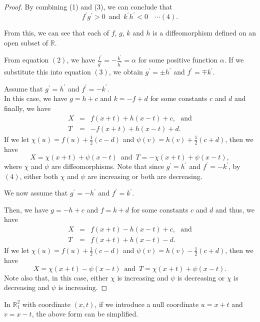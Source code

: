 \documentclass[a4paper,10pt]{amsart}
\theoremstyle{plain}
\newtheorem*{main theorem}{Theorem}
\theoremstyle{definition}
\begin{document}
\begin{proof}
By combining (1) and (3), we can conclude that
$$ f^\prime g^\prime >0 \,\,\, \mbox{and} \,\,\, k^\prime h^\prime
< 0 \,\,\,\,\,\, \cdots(4).$$

From this, we can see that each of $f$, $g$, $k$ and $h$ is a
diffeomorphism defined on an open subset of $\mathbb{R}$.

From equation $(2)$, we have $\frac{f^\prime}{g^\prime} = -
\frac{k^\prime}{h^\prime} = \alpha$ for some positive function
$\alpha$. If we substitute this into equation $(3)$, we obtain
$g^\prime = \pm h^\prime$ and $f^\prime = \mp k^\prime$.


Assume that $g^\prime = h^\prime$ and $f^\prime = -k^\prime$.\\
 In this case, we have $g = h + c$ and $k = -f + d$ for some
 constants $c$ and $d$ and finally, we have
 \begin{eqnarray*}
 X &=& f(x+t) + h(x-t) +c, \,\,\,\, \mbox{and} \\
  T &=& -f(x+t) + h(x-t) + d.
  \end{eqnarray*}
If we let $\chi(u) = f(u) + \frac{1}{2}(c-d)$ and $\psi(v) = h(v)
+ \frac{1}{2}(c+d)$, then we have
$$ X = \chi(x+t) + \psi(x-t) \,\,\, \mbox{and} \,\,\, T =
-\chi(x+t) + \psi(x-t),$$ where $\chi$ and $\psi$ are
diffeomorphisms. Note that since $g^\prime = h^\prime$ and
$f^\prime = -k^\prime$, by $(4)$, either both $\chi$ and $\psi$
are increasing or both are decreasing.

We now assume that $g^\prime = -h^\prime$ and $f^\prime =
k^\prime$.

Then, we have $g = -h + c$ and $f = k + d$ for some constants $c$
and $d$ and thus, we have
 \begin{eqnarray*}
 X &=& f(x+t) - h(x-t) + c, \,\,\,\, \mbox{and} \\
  T &=& f(x+t) + h(x-t) - d.
  \end{eqnarray*}
If we let $\chi(u) = f(u) + \frac{1}{2}(c-d)$ and $\psi(v) = h(v)
- \frac{1}{2}(c+d)$, then we have
$$ X = \chi(x+t) - \psi(x-t) \,\,\, \mbox{and} \,\,\, T =
\chi(x+t) + \psi(x-t).$$ Note also that, in this case, either
$\chi$ is increasing and $\psi$ is decreasing or $\chi$ is
decreasing and $\psi$ is increasing.

\end{proof}


In $\mathbb{R}^2_1$ with coordinate $(x,t)$, if we introduce a
null coordinate $u = x + t$ and $v = x - t$, the above form can be
simplified.
\end{document}
